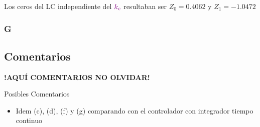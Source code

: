 Los ceros del LC independiente del \(\mathbin{\color{violet}k_c}\) resultaban ser $Z_{0} = 0.4062 $ y $Z_{1} = -1.0472$ 

\FloatBarrier
\subsubsection{G}%


\FloatBarrier
\subsection{Comentarios}


\textbf{!AQUÍ COMENTARIOS NO OLVIDAR!}

Posibles Comentarios
\begin{itemize}
    \item Idem (c), (d), (f) y (g) comparando con el controlador con integrador tiempo continuo
\end{itemize}
